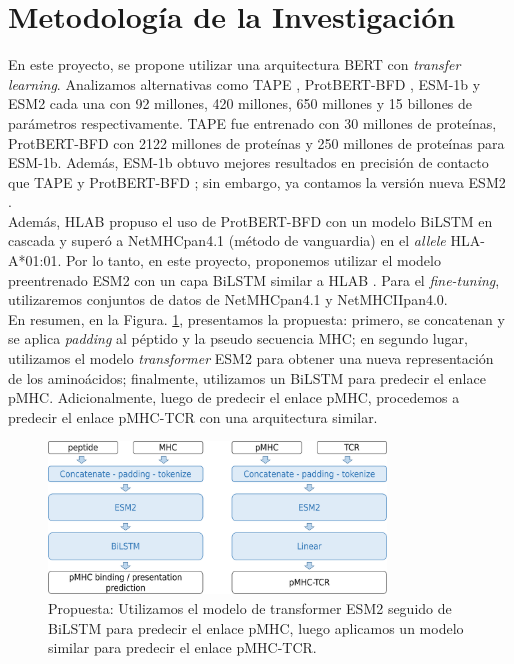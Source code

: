 \documentclass[a4paper]{article}
\begin{document}
\section{Metodología de la Investigación} 

En este proyecto, se propone utilizar una arquitectura BERT con \textit{transfer learning}. Analizamos alternativas como TAPE \citep{rao2019evaluating}, ProtBERT-BFD \citep{elnaggar2021prottrans}, ESM-1b \citep{rives2021biological} y ESM2 \citep{lin2023evolutionary} cada una con 92 millones, 420 millones, 650 millones y 15 billones de parámetros respectivamente. TAPE fue entrenado con 30 millones de proteínas, ProtBERT-BFD con 2122 millones de proteínas y 250 millones de proteínas para ESM-1b. Además, ESM-1b obtuvo mejores resultados en precisión de contacto que TAPE y ProtBERT-BFD \citep{rives2021biological}; sin embargo, ya contamos la versión nueva ESM2 \citep{lin2023evolutionary}.\\

Además, HLAB \citep{zhang2022hlab} propuso el uso de ProtBERT-BFD \citep{elnaggar2021prottrans} con un modelo BiLSTM en cascada y superó a NetMHCpan4.1 (método de vanguardia) en el \textit{allele} HLA-A*01:01. Por lo tanto, en este proyecto, proponemos utilizar el modelo preentrenado ESM2 \citep{lin2023evolutionary} con un capa BiLSTM  similar a HLAB \citep{zhang2022hlab}. Para el \textit{fine-tuning}, utilizaremos conjuntos de datos de NetMHCpan4.1 y NetMHCIIpan4.0.\\

En resumen, en la Figura. \ref{fig:proposal}, presentamos la propuesta: primero, se concatenan y se aplica \textit{padding} al péptido y la pseudo secuencia MHC; en segundo lugar, utilizamos el modelo \textit{transformer} ESM2 para obtener una nueva representación de los aminoácidos; finalmente, utilizamos un BiLSTM para predecir el enlace pMHC. Adicionalmente, luego de predecir el enlace pMHC, procedemos a predecir el enlace pMHC-TCR con una arquitectura similar.





\begin{figure}[H]
	\centering
	\includegraphics[width=0.8\textwidth]{img/proposal}
	\caption{Propuesta: Utilizamos el modelo de transformer ESM2 seguido de BiLSTM para predecir el enlace pMHC, luego aplicamos un modelo similar para predecir el enlace pMHC-TCR.}
	\label{fig:proposal}
\end{figure}
\end{document}
